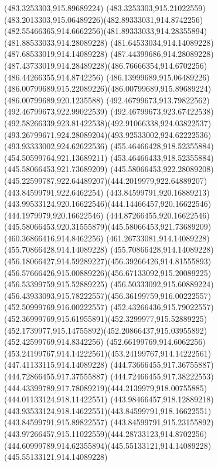 {{{{				\lineto(483.3253303,915.89689224)
				\curveto(483.3253303,915.21022559)(483.2013303,915.06489226)(482.89333031,914.8742256)
				\curveto(482.55466365,914.6662256)(481.89333033,914.28355894)(481.88533033,914.28089228)
				\lineto(481.64533034,914.14089228)
				\lineto(487.68533019,914.14089228)
				\lineto(487.44399686,914.28089228)
				\curveto(487.43733019,914.28489228)(486.76666354,914.6702256)(486.44266355,914.8742256)
				\curveto(486.13999689,915.06489226)(486.00799689,915.22089226)(486.00799689,915.89689224)
				\lineto(486.00799689,920.1235588)
				\lineto(492.46799673,913.79822562)
				\lineto(492.46799673,922.99022539)
				\curveto(492.46799673,923.67422538)(492.58266339,923.81422538)(492.91066338,924.03822537)
				\curveto(493.26799671,924.28089204)(493.92533002,924.62222536)(493.93333002,924.62622536)
				\closepath
				\moveto(455.46466428,918.52355884)
				\lineto(454.50599764,921.13689211)
				\lineto(453.46466433,918.52355884)
				\closepath
				\moveto(445.58066453,921.73689209)
				\curveto(445.58066453,922.28089208)(445.22599787,922.64489207)(444.2019979,922.64889207)
				\lineto(443.84599791,922.6462254)
				\lineto(443.84599791,920.16889213)
				\curveto(443.99533124,920.16622546)(444.14466457,920.16622546)(444.1979979,920.16622546)
				\curveto(444.87266455,920.16622546)(445.58066453,920.31555879)(445.58066453,921.73689209)
				\moveto(460.36866416,914.8462256)
				\lineto(461.26733081,914.14089228)
				\lineto(455.70866428,914.14089228)
				\curveto(455.70866428,914.14089228)(456.18066427,914.59289227)(456.39266426,914.81555893)
				\curveto(456.57666426,915.00889226)(456.67133092,915.20089225)(456.53399759,915.52889225)
				\curveto(456.50333092,915.60889224)(456.43933093,915.78222557)(456.36199759,916.00222557)
				\lineto(452.50999769,916.00222557)
				\curveto(452.43266436,915.79022557)(452.36999769,915.61955891)(452.3299977,915.52889225)
				\curveto(452.1739977,915.14755892)(452.20866437,915.03955892)(452.42599769,914.8342256)
				\curveto(452.66199769,914.6062256)(453.24199767,914.14222561)(453.24199767,914.14222561)
				\lineto(447.41133115,914.14089228)
				\lineto(444.73666455,917.36755887)
				\lineto(444.72866455,917.37555887)
				\lineto(444.72466455,917.38222553)
				\curveto(444.43399789,917.78089219)(444.2139979,918.00755885)(444.01133124,918.11422551)
				\curveto(443.98466457,918.12889218)(443.93533124,918.14622551)(443.84599791,918.16622551)
				\lineto(443.84599791,915.89822557)
				\curveto(443.84599791,915.23155892)(443.97266457,915.11022559)(444.28733123,914.8702256)
				\curveto(444.60999789,914.62355894)(445.55133121,914.14089228)(445.55133121,914.14089228)
}}}}
